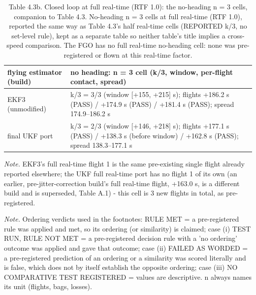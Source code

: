 \begin{table}[htbp]
\centering
\footnotesize
\caption{Table 4.3b. Closed loop at full real-time (RTF 1.0): the no-heading n = 3 cells, companion to Table 4.3. No-heading n = 3 cells at full real-time (RTF 1.0), reported the same way as Table 4.3's half real-time cells (REPORTED k/3, no set-level rule), kept as a separate table so neither table's title implies a cross-speed comparison. The FGO has no full real-time no-heading cell: none was pre-registered or flown at this real-time factor.}
\label{tab:4-3b}
\begin{tabular}{p{}p{}}
\toprule
\textbf{flying estimator (build)} & \textbf{no heading: n = 3 cell (k/3, window, per-flight contact, spread)} \\
\midrule
EKF3 (unmodified) & k/3 = 3/3 (window [+155, +215] s); flights +186.2 s (PASS) / +174.9 s (PASS) / +181.4 s (PASS); spread 174.9--186.2 s \\
final UKF port & k/3 = 2/3 (window [+146, +218] s); flights +177.1 s (PASS) / +138.3 s (before window) / +162.8 s (PASS); spread 138.3--177.1 s \\
\bottomrule
\end{tabular}
\par\smallskip\raggedright
\textit{Note.} EKF3's full real-time flight 1 is the same pre-existing single flight already reported elsewhere; the UKF full real-time port has no flight 1 of its own (an earlier, pre-jitter-correction build's full real-time flight, +163.0 s, is a different build and is superseded, Table A.1) - this cell is 3 new flights in total, as pre-registered.\par
\textit{Note.} Ordering verdicts used in the footnotes: RULE MET = a pre-registered rule was applied and met, so its ordering (or similarity) is claimed; case (i) TEST RUN, RULE NOT MET = a pre-registered decision rule with a 'no ordering' outcome was applied and gave that outcome; case (ii) FAILED AS WORDED = a pre-registered prediction of an ordering or a similarity was scored literally and is false, which does not by itself establish the opposite ordering; case (iii) NO COMPARATIVE TEST REGISTERED = values are descriptive. n always names its unit (flights, bags, losses).\par
\end{table}
